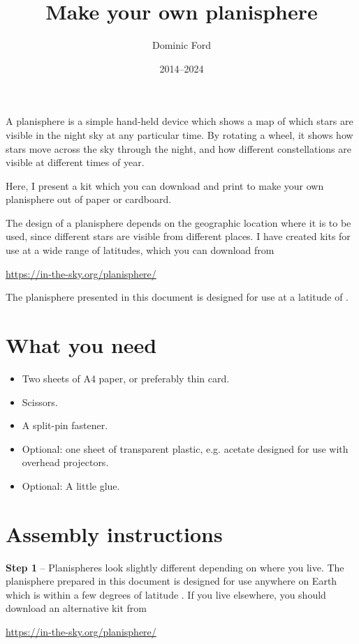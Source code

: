 \documentclass[a4paper,onecolumn,10pt]{article}
\title{Make your own planisphere}
\author{Dominic Ford}
\date{2014--2024}
\begin{document}
\maketitle
\setcounter{footnote}{1}

A planisphere is a simple hand-held device which shows a map of which stars are
visible in the night sky at any particular time. By rotating a wheel, it shows
how stars move across the sky through the night, and how different
constellations are visible at different times of year.

Here, I present a kit which you can download and print to make your own
planisphere out of paper or cardboard.

The design of a planisphere depends on the geographic location where it is to
be used, since different stars are visible from different places. I have
created kits for use at a wide range of latitudes, which you can download from

\url{https://in-the-sky.org/planisphere/}

The planisphere presented in this document is designed for use at a latitude of
.
 
\section*{What you need}

\begin{itemize}
\item Two sheets of A4 paper, or preferably thin card.
\item Scissors.
\item A split-pin fastener.
\item Optional: one sheet of transparent plastic, e.g. acetate designed for use with overhead projectors.
\item Optional: A little glue.
\end{itemize}

\section*{Assembly instructions}

{\bf Step 1} -- Planispheres look slightly different depending on where you
live. The planisphere prepared in this document is designed for use anywhere on
Earth which is within a few degrees of latitude . If you live
elsewhere, you should download an alternative kit from

\url{https://in-the-sky.org/planisphere/}
\end{document}
